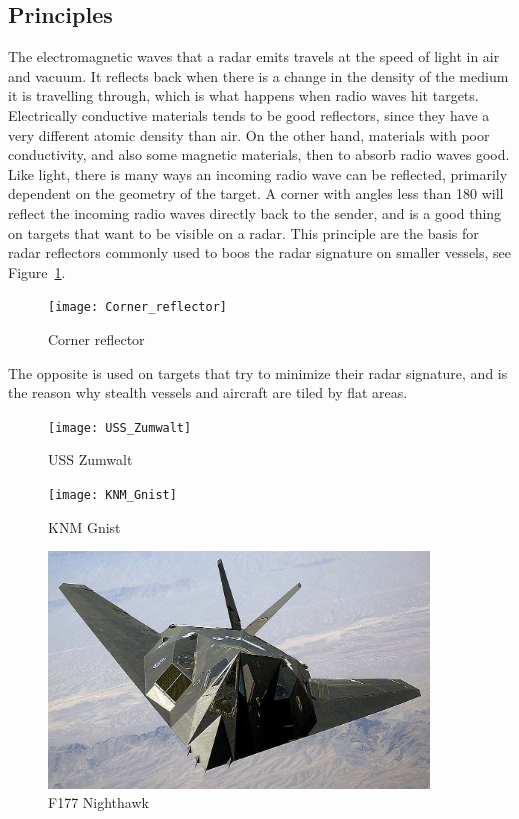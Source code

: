 \subsection{Principles}
The electromagnetic waves that a radar emits travels at the speed of light in air and vacuum. It reflects back when there is a change in the density of the medium it is travelling through, which is what happens when radio waves hit targets. Electrically conductive materials tends to be good reflectors, since they have a very different atomic density than air. On the other hand, materials with poor conductivity, and also some magnetic materials, then to absorb radio waves good. Like light, there is many ways an incoming radio wave can be reflected, primarily dependent on the geometry of the target. A corner with angles less than 180\degsym{} will reflect the incoming radio waves directly back to the sender, and is a good thing on targets that want to be visible on a radar. This principle are the basis for radar reflectors commonly used to boos the radar signature on smaller vessels, see Figure~\ref{fig:corner_reflector}.
\begin{figure}
\centering
\texttt{[image: Corner\_reflector]}
\caption{Corner reflector}\label{fig:corner_reflector}
\end{figure}
The opposite is used on targets that try to minimize their radar signature, and is the reason why stealth vessels and aircraft are tiled by flat areas. 
\begin{figure}
\centering
\begin{minipage}{0.3\textwidth}
\texttt{[image: USS\_Zumwalt]}
\caption{USS Zumwalt}\label{fig:uss_zumwalt}
\end{minipage}\hfill
\begin{minipage}{0.3\textwidth}
\texttt{[image: KNM\_Gnist]}
\caption{KNM Gnist}\label{fig:knm_gnist}
\end{minipage}\hfill
\begin{minipage}{0.3\textwidth}
\includegraphics[width=0.9\textwidth]{Figures/F-117_Nighthawk}
\caption{F177 Nighthawk}\label{fig:f177_nighthawk}
\end{minipage}
\end{figure}

